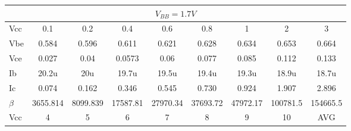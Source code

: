             \begin{table}[H]
                \centering
                \begin{tabular}{ccccccccc}
                \hline
                \multicolumn{9}{c}{$V_{BB}=1.7V$}                                                                                                                                                                                                                                      \\ \hline
                \multicolumn{1}{l|}{Vcc}     & \multicolumn{1}{c}{0.1}      & \multicolumn{1}{c}{0.2}      & \multicolumn{1}{c}{0.4}      & \multicolumn{1}{c}{0.6}      & \multicolumn{1}{c}{0.8}      & \multicolumn{1}{c}{1}        & \multicolumn{1}{c}{2}        & 3        \\ 
                \multicolumn{1}{l|}{Vbe}     & \multicolumn{1}{c}{0.584}    & \multicolumn{1}{c}{0.596}    & \multicolumn{1}{c}{0.611}    & \multicolumn{1}{c}{0.621}    & \multicolumn{1}{c}{0.628}    & \multicolumn{1}{c}{0.634}    & \multicolumn{1}{c}{0.653}    & 0.664    \\ 
                \multicolumn{1}{l|}{Vce}     & \multicolumn{1}{c}{0.027}    & \multicolumn{1}{c}{0.04}     & \multicolumn{1}{c}{0.0573}   & \multicolumn{1}{c}{0.06}     & \multicolumn{1}{c}{0.077}    & \multicolumn{1}{c}{0.085}    & \multicolumn{1}{c}{0.112}    & 0.133    \\ 
                \multicolumn{1}{l|}{Ib}      & \multicolumn{1}{c}{20.2u}    & \multicolumn{1}{c}{20u}      & \multicolumn{1}{c}{19.7u}    & \multicolumn{1}{c}{19.5u}    & \multicolumn{1}{c}{19.4u}    & \multicolumn{1}{c}{19.3u}    & \multicolumn{1}{c}{18.9u}    & 18.7u    \\ 
                \multicolumn{1}{l|}{Ic}      & \multicolumn{1}{c}{0.074}    & \multicolumn{1}{c}{0.162}    & \multicolumn{1}{c}{0.346}    & \multicolumn{1}{c}{0.545}    & \multicolumn{1}{c}{0.730}    & \multicolumn{1}{c}{0.924}    & \multicolumn{1}{c}{1.907}    & 2.896    \\ 
                \multicolumn{1}{l|}{$\beta$} & \multicolumn{1}{c}{3655.814} & \multicolumn{1}{c}{8099.839} & \multicolumn{1}{c}{17587.81} & \multicolumn{1}{c}{27970.34} & \multicolumn{1}{c}{37693.72} & \multicolumn{1}{c}{47972.17} & \multicolumn{1}{c}{100781.5} & 154665.5 \\ 
                \hline
                \hline
                \multicolumn{1}{l|}{Vcc}     & \multicolumn{1}{c}{4}        & \multicolumn{1}{c}{5}        & \multicolumn{1}{c}{6}        & \multicolumn{1}{c}{7}        & \multicolumn{1}{c}{8}        & \multicolumn{1}{c}{9}        & \multicolumn{1}{c}{10}       & AVG      \\ 

\end{tabular}
\end{table}

